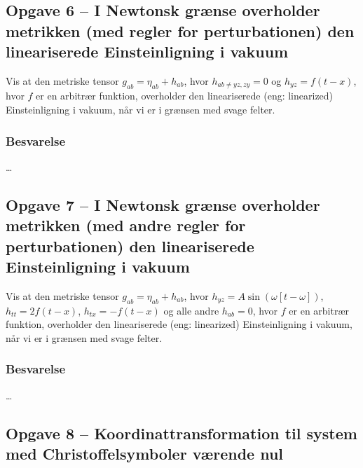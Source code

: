 \documentclass[../main.tex]{subfiles}
\begin{document}

\subsection{Opgave 6 -- I Newtonsk grænse overholder metrikken (med regler for perturbationen) den lineariserede Einsteinligning i vakuum}
\setcounter{subsection}{6}
\setcounter{equation}{0}

Vis at den metriske tensor $g_{ab} = \eta_{ab} + h_{ab}$, hvor $h_{ab \ne yz,zy} = 0$ og $h_{yz} = f(t - x)$, hvor $f$ er en arbitrær funktion, overholder den lineariserede (eng: linearized) Einsteinligning i vakuum, når vi er i grænsen med svage felter.


\subsubsection{Besvarelse}

\ldots




\subsection{Opgave 7 -- I Newtonsk grænse overholder metrikken (med andre regler for perturbationen) den lineariserede Einsteinligning i vakuum}
\setcounter{subsection}{7}
\setcounter{equation}{0}

Vis at den metriske tensor $g_{ab} = \eta_{ab} + h_{ab}$, hvor $h_{yz} = A \sin(\omega[t-\omega])$, $h_{tt} = 2 f(t - x)$, $h_{tx} = - f(t - x)$ og alle andre $h_{ab} = 0$, hvor $f$ er en arbitrær funktion, overholder den lineariserede (eng: linearized) Einsteinligning i vakuum, når vi er i grænsen med svage felter.


\subsubsection{Besvarelse}

\ldots




\subsection{Opgave 8 -- Koordinattransformation til system med Christoffelsymboler værende nul}
\setcounter{subsection}{8}
\setcounter{equation}{0}
\end{document}
